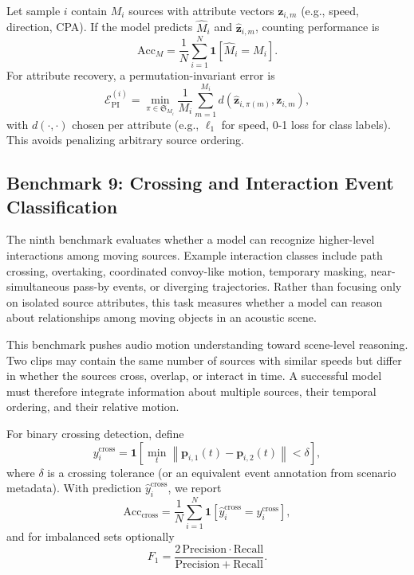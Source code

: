 \documentclass{article}
\begin{document}
Let sample \(i\) contain \(M_i\) sources with attribute vectors \(\mathbf{z}_{i,m}\) (e.g., speed, direction, CPA). If the model predicts \(\hat M_i\) and \(\hat{\mathbf{z}}_{i,m}\), counting performance is
\begin{equation}
  \mathrm{Acc}_{M}=\frac{1}{N}\sum_{i=1}^{N}\mathbf{1}[\hat M_i=M_i].
\end{equation}
For attribute recovery, a permutation-invariant error is
\begin{equation}
  \mathcal{E}_{\text{PI}}^{(i)}=\min_{\pi\in\mathfrak{S}_{M_i}}\frac{1}{M_i}\sum_{m=1}^{M_i}
  d\!\left(\hat{\mathbf{z}}_{i,\pi(m)},\mathbf{z}_{i,m}\right),
\end{equation}
with \(d(\cdot,\cdot)\) chosen per attribute (e.g., \(\ell_1\) for speed, 0-1 loss for class labels). This avoids penalizing arbitrary source ordering.

\subsection{Benchmark 9: Crossing and Interaction Event Classification}

The ninth benchmark evaluates whether a model can recognize higher-level interactions among moving sources. Example interaction classes include path crossing, overtaking, coordinated convoy-like motion, temporary masking, near-simultaneous pass-by events, or diverging trajectories. Rather than focusing only on isolated source attributes, this task measures whether a model can reason about relationships among moving objects in an acoustic scene.

This benchmark pushes audio motion understanding toward scene-level reasoning. Two clips may contain the same number of sources with similar speeds but differ in whether the sources cross, overlap, or interact in time. A successful model must therefore integrate information about multiple sources, their temporal ordering, and their relative motion.

For binary crossing detection, define
\begin{equation}
  y_i^{\text{cross}}=
  \mathbf{1}\!\left[\min_{t}\left\|\mathbf{p}_{i,1}(t)-\mathbf{p}_{i,2}(t)\right\|<\delta\right],
\end{equation}
where \(\delta\) is a crossing tolerance (or an equivalent event annotation from scenario metadata). With prediction \(\hat y_i^{\text{cross}}\), we report
\begin{equation}
  \mathrm{Acc}_{\text{cross}}=\frac{1}{N}\sum_{i=1}^{N}\mathbf{1}\!\left[\hat y_i^{\text{cross}}=y_i^{\text{cross}}\right],
\end{equation}
and for imbalanced sets optionally
\begin{equation}
  F_1=\frac{2\,\mathrm{Precision}\cdot\mathrm{Recall}}{\mathrm{Precision}+\mathrm{Recall}}.
\end{equation}
\end{document}
